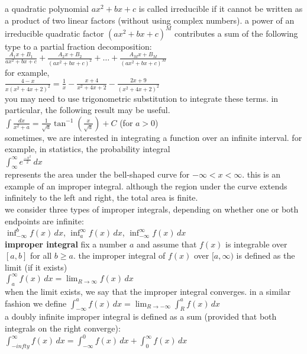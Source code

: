 \documentclass{article}
\begin{document}
a quadratic polynomial $ax^2 + bx + c$ is called irreducible if it cannot be written as a product of two linear factors (without using complex numbers). a power of an irreducible quadratic factor $(ax^2 + bx + c)^M$ contributes a sum of the following type to a partial fraction decomposition:\\
$\frac{A_1x + B_1}{ax^2 + bx + c} + \frac{A_2x + B_2}{(ax^2 + bx + c)^2} + \ldots + \frac{A_Mx + B_M}{(ax^2 + bx + c)^M}$\\
for example,\\
$\frac{4 - x}{x(x^2 + 4x + 2)^2} = \frac{1}{x} - \frac{x + 4}{x^2 + 4x + 2} - \frac{2x + 9}{(x^2 + 4x + 2)^2}$\\
you may need to use trigonometric substitution to integrate these terms. in particular, the following result may be useful.\\
$\int\frac{dx}{x^2 + a} = \frac{1}{\sqrt{a}}\tan^{-1}(\frac{x}{\sqrt{a}}) + C$ (for $a > 0$)\\

sometimes, we are interested in integrating a function over an infinite interval. for example, in statistics, the probability integral\\ $\int_{\infty}^{\infty}e^{\frac{-x^2}{2}}\,dx$\\ represents the area under the bell-shaped curve for $-\infty < x < \infty$. this is an example of an improper integral. although the region under the curve extends infinitely to the left and right, the total area is finite.\\ we consider three types of improper integrals, depending on whether one or both endpoints are infinite:\\ $\inf_{-\infty}^{b}f(x)\,dx$, $\inf_{a}^{\infty}f(x)\,dx$, $\inf_{-\infty}^{\infty}f(x)\,dx$\\

\textbf{improper integral} fix a number $a$ and assume that $f(x)$ is integrable over $[a, b]$ for all $b \geq a$. the improper integral of $f(x)$ over $[a, \infty)$ is defined as the limit (if it exists)\\
$\int_{a}^{\infty}f(x)\,dx = \lim_{R \to \infty}f(x)\,dx$\\
when the limit exists, we say that the improper integral converges. in a similar fashion we define $\int_{-\infty}^{a}f(x)\,dx = \lim_{R \to -\infty}\int_{R}^{a}f(x)\,dx$\\

a doubly infinite improper integral is defined as a sum (provided that both integrals on the right converge):\\
$\int_{-infty}^{\infty}f(x)\,dx = \int_{-\infty}^{0}f(x)\,dx + \int_{0}^{\infty}f(x)\,dx$\\
\end{document}
